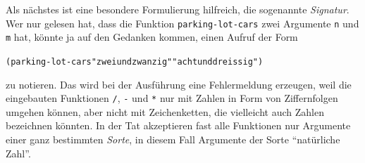 Als nächstes ist eine besondere Formulierung hilfreich, die
sogenannte \textit{Signatur}. Wer nur gelesen hat, dass die
Funktion \texttt{parking-lot-cars} zwei Argumente \texttt{n} und
\texttt{m} hat, könnte ja auf den Gedanken kommen, einen Aufruf der
Form

\begin{alltt}
(parking-lot-cars "zweiundzwanzig" "achtunddreissig")
\end{alltt}
zu notieren.  Das wird bei der Ausführung eine Fehlermeldung erzeugen, weil die
eingebauten Funktionen \texttt{/}, \texttt{-} und \texttt{*} nur mit Zahlen in
Form von Ziffernfolgen umgehen können, aber nicht mit Zeichenketten, die
vielleicht auch Zahlen bezeichnen könnten.  In der Tat akzeptieren fast alle
Funktionen nur Argumente einer ganz bestimmten \emph{Sorte}, in
diesem Fall Argumente der Sorte "`natürliche Zahl"'.


